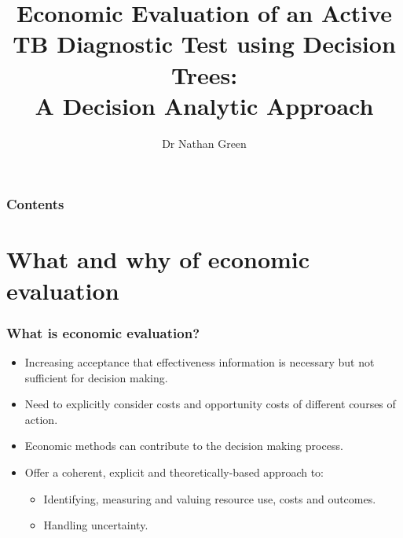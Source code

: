 \documentclass[t]{beamer}
\author{Dr Nathan Green}
\title[Decision analytic modelling for economic evaluation]{Economic Evaluation of an Active TB Diagnostic Test using Decision Trees:\\ A Decision Analytic Approach}
\begin{document}
\frame{\maketitle}


\begin{frame}
	\frametitle{Contents}
	\tableofcontents[%
    	pausesections, %
	]
\end{frame}


\section{What and why of economic evaluation}

\begin{frame}
\frametitle{What is economic evaluation?}
	\begin{itemize}
		\item Increasing acceptance that effectiveness information is necessary but not sufficient for decision making.
		\uncover
		\item Need to \alert{explicitly} consider costs and opportunity costs of different courses of action.
		\item Economic methods can contribute to the decision making process.
		\item Offer a \alert{coherent, explicit and theoretically-based} approach to:
		\begin{itemize}
			\item Identifying, measuring and valuing resource use, costs and
outcomes.
			\item Handling uncertainty.
		\end{itemize}
	\end{itemize}
\end{frame}
\end{document}
